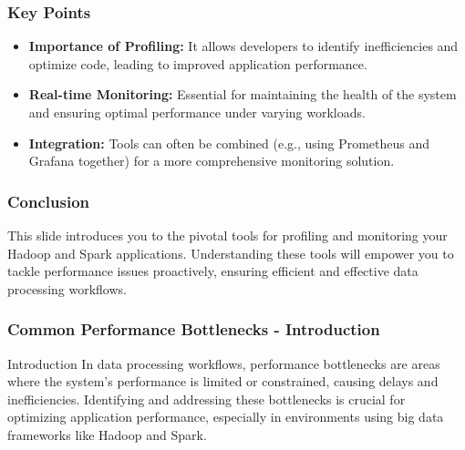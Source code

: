 \documentclass[aspectratio=169]{beamer}
\begin{document}
\begin{frame}[fragile]
    \frametitle{Key Points}
    \begin{itemize}
        \item \textbf{Importance of Profiling:} It allows developers to identify inefficiencies and optimize code, leading to improved application performance.
        \item \textbf{Real-time Monitoring:} Essential for maintaining the health of the system and ensuring optimal performance under varying workloads.
        \item \textbf{Integration:} Tools can often be combined (e.g., using Prometheus and Grafana together) for a more comprehensive monitoring solution.
    \end{itemize}
\end{frame}

\begin{frame}[fragile]
    \frametitle{Conclusion}
    This slide introduces you to the pivotal tools for profiling and monitoring your Hadoop and Spark applications. Understanding these tools will empower you to tackle performance issues proactively, ensuring efficient and effective data processing workflows.
\end{frame}

\begin{frame}[fragile]
    \frametitle{Common Performance Bottlenecks - Introduction}
    \begin{block}{Introduction}
        In data processing workflows, performance bottlenecks are areas where the system's performance is limited or constrained, causing delays and inefficiencies. Identifying and addressing these bottlenecks is crucial for optimizing application performance, especially in environments using big data frameworks like Hadoop and Spark.
    \end{block}
\end{frame}
\end{document}
